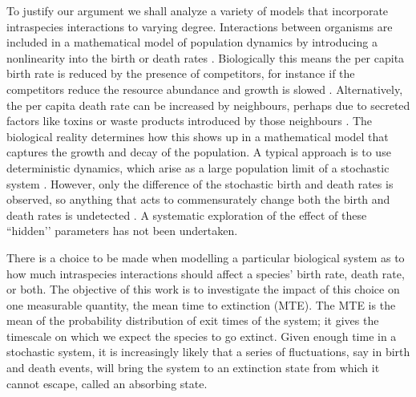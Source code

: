 To justify our argument we shall analyze a variety of models that incorporate intraspecies interactions to varying degree. %
Interactions between organisms are included in a mathematical model of population dynamics by introducing a nonlinearity into the birth or death rates \cite{Greenhalgh1990,Ovaskainen2010,Assaf2010,Allen2003,Norden1982,Newman2004,Allen2005,Fujita1953,Nasell2001}. %
Biologically this means the per capita birth rate is reduced by the presence of competitors, for instance if the competitors reduce the resource abundance and growth is slowed \cite{Nadell2008,Vulic2001}. 
Alternatively, the per capita death rate can be increased by neighbours, perhaps due to secreted factors like toxins or waste products introduced by those neighbours \cite{Greenhalgh1990,VanMelderen2009,Rankin2012}. 
The biological reality determines how this shows up in a mathematical model that captures the growth and decay of the population. 
A typical approach is to use deterministic dynamics, which arise as a large population limit of a stochastic system \cite{Nisbet1982,Gardiner2004,Rouzine2001}. %
However, only the difference of the stochastic birth and death rates is observed, so anything that acts to commensurately change both the birth and death rates is undetected \cite{Norden1982,Nasell2001}. 
A systematic exploration of the effect of these ``hidden’’ parameters has not been undertaken. %

There is a choice to be made when modelling a particular biological system as to how much intraspecies interactions should affect a species’ birth rate, death rate, or both. %
The objective of this work is to investigate the impact of this choice on one measurable quantity, the mean time to extinction (MTE).
The MTE is the mean of the probability distribution of exit times of the system; it gives the timescale on which we expect the species to go extinct.
Given enough time in a stochastic system, it is increasingly likely that a series of fluctuations, say in birth and death events, will bring the system to an extinction state from which it cannot escape, called an absorbing state. %

